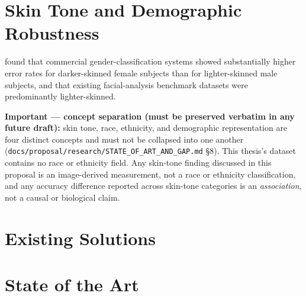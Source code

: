 \section{Skin Tone and Demographic Robustness}
\label{sec:lit-skin-tone}
\citet{buolamwini2018gender} found that commercial gender-classification systems showed substantially higher error rates for darker-skinned female subjects than for lighter-skinned male subjects, and that existing facial-analysis benchmark datasets were predominantly lighter-skinned.

\textbf{Important — concept separation (must be preserved verbatim in any future draft):} skin tone, race, ethnicity, and demographic representation are four distinct concepts and must not be collapsed into one another (\texttt{docs/proposal/research/STATE\_OF\_ART\_AND\_GAP.md} \S8). This thesis's dataset contains no race or ethnicity field. Any skin-tone finding discussed in this proposal is an image-derived measurement, not a race or ethnicity classification, and any accuracy difference reported across skin-tone categories is an \emph{association}, not a causal or biological claim.


\section{Existing Solutions}
\label{sec:lit-existing-solutions}

\section{State of the Art}
\label{sec:lit-state-of-the-art}

